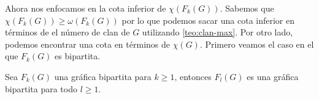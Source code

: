 

Ahora nos enfocamos en la cota inferior de $ \chi (F_k(G))$. Sabemos que $\chi
(F_k(G)) \geq \omega (F_k(G))$ por lo que podemos sacar una cota inferior en
t\'erminos de el n\'umero de clan de $G$ utilizando \cref{teo:clan-max}. Por
otro lado, podemos encontrar una cota en t\'erminos de $\chi (G)$. Primero
veamos el caso en el que $F_k(G)$ es bipartita.


\begin{proposicion}
\label{prop:biparticion F(G)}
    Sea $F_k(G)$ una gr\'afica bipartita para $k \geq 1$, entonces $F_l(G)$
    es una gr\'afica bipartita para todo $l \geq 1$.
\end{proposicion}

